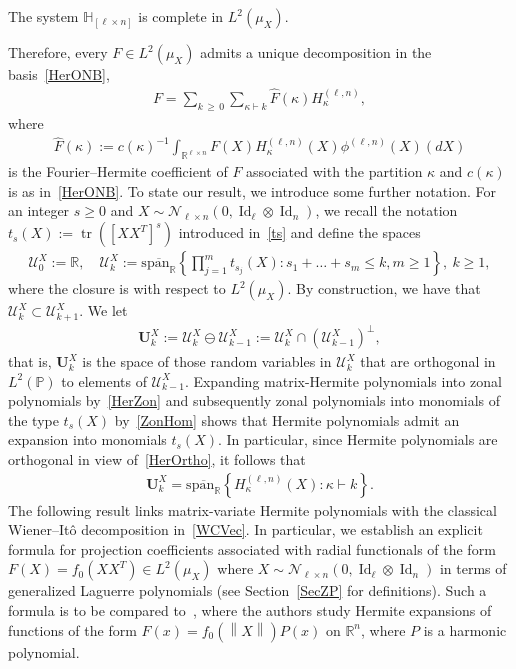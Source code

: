 \documentclass[10pt]{amsart}
\theoremstyle{definition}\newtheorem{defi}[theo]{Definition}\newtheorem{rema}[theo]{Remark}\newtheorem{exam}[theo]{Example}\newtheorem{exem}[theo]{Example}\newtheorem{nota}[theo]{Notation}
\DeclareMathOperator{\Id}{Id}
\DeclareMathOperator{\Tr}{tr}
\newcommand{\scN}{\mathscr{N}}
\newcommand{\spanl}{\mathrm{span}}
\newcommand{\bfU}{\mathbf{U}}
\newcommand{\clU}{\mathcal{U}}
\newcommand{\R}{\mathbb{R}}
\newcommand{\bbH}{\mathbb{H}}
\newcommand{\Prob}{\mathbb{P}}
\newcommand{\norm}[1]{\left\lVert#1\right\rVert}
\begin{document}
\begin{prop}\label{Prop:Complete}
The system $\bbH_{[\ell\times n]}$ is complete in $L^2(\mu_X)$.
\end{prop}

Therefore, every $F \in L^2(\mu_X)$ admits a unique decomposition in the basis~\eqref{HerONB},
\begin{gather}\label{Decomp}
F = \sum_{k\,\geq\,0} \sum_{ \kappa \vdash k} \widehat{F}(\kappa) H_{\kappa}^{(\ell,n)},
\end{gather}
where
\begin{gather}\label{Coeff}
\widehat{F}(\kappa) := c(\kappa)^{-1} \int_{\R^{\ell\times n}} F(X) H_{\kappa}^{(\ell,n)}(X) \phi^{(\ell,n)}(X)(dX)
\end{gather}
is the Fourier--Hermite coefficient of $F$ associated with the partition $\kappa$ and $c(\kappa)$ is as in~\eqref{HerONB}. To state our result, we introduce some further notation. For an integer $s\geq 0$ and $X \sim \scN_{\ell\times n}(0,\Id_{\ell}\otimes \Id_n)$, we recall the notation $ t_{s}(X) := \Tr{([XX^T]^s)} $ introduced in~\eqref{ts} and define the spaces
\begin{gather*}
\clU_0^X := \R, \quad \clU_k^X := \overline{\spanl_{\R}}\left\{ \prod_{j=1}^m t_{s_j}(X) : s_1+\ldots+s_m \leq k, m \geq 1\right\}, \ k\geq1,
\end{gather*}
where the closure is with respect to $L^2(\mu_X)$. By construction, we have that $ \clU_k^X \subset \clU_{k+1}^X$. We let
\begin{gather*}
\bfU_{k}^X:= \clU_k^X \ominus \clU_{k-1}^X := \clU_k^X \cap \left(\clU_{k-1}^X\right)^{\perp},
\end{gather*}
that is, $\bfU_k^X$ is the space of those random variables in $\clU_k^X$ that are orthogonal in $L^2(\Prob)$ to elements of $\clU_{k-1}^X$. Expanding matrix-Hermite polynomials into zonal polynomials by~\eqref{HerZon} and subsequently zonal polynomials into monomials of the type $t_s(X)$ by~\eqref{ZonHom} shows that Hermite polynomials admit an expansion into monomials $t_s(X)$. In particular, since Hermite polynomials are orthogonal in view of~\eqref{HerOrtho}, it follows that
\begin{gather*}
\bfU_k^X = \overline{\spanl_{\R}}\left\{ H_{\kappa}^{(\ell,n)}(X) : \kappa \vdash k \right\}.
\end{gather*}
The following result links matrix-variate Hermite polynomials with the classical Wiener--Itô decomposition in~\eqref{WCVec}. In particular, we establish an explicit formula for projection coefficients associated with radial functionals of the form $F(X)=f_0(XX^T)\in L^2(\mu_X)$ where $X\sim \scN_{\ell \times n}(0,\Id_{\ell}\otimes \Id_n)$ in terms of generalized Laguerre polynomials (see Section~\ref{SecZP} for definitions). Such a formula is to be compared to~\cite{Kochneff,Thangavelu}, where the authors study Hermite expansions of functions of the form $F(x)=f_0(\norm{X})P(x)$ on $\R^n$, where $P$ is a harmonic polynomial.
\end{document}
